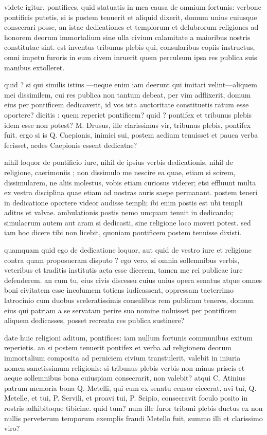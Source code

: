  videte igitur, pontifices, quid statuatis in mea causa de omnium fortunis: verbone pontificis putetis, si is postem tenuerit et aliquid dixerit, domum unius cuiusque consecrari posse, an istae dedicationes et templorum et delubrorum religiones ad honorem deorum immortalium sine ulla civium calamitate a maioribus nostris constitutae sint. est inventus tribunus plebis qui, consularibus copiis instructus, omni impetu furoris in eum civem inruerit quem perculsum ipsa res publica suis manibus extolleret.

 quid ? si qui similis istius —neque enim iam deerunt qui imitari velint—aliquem mei dissimilem, cui res publica non tantum debeat, per vim adflixerit, domum eius per pontificem dedicaverit, id vos ista auctoritate constituetis ratum esse oportere? dicitis : quem reperiet pontificem? quid ? pontifex et tribunus plebis idem esse non potest? M. Drusus, ille clarissimus vir, tribunus plebis, pontifex fuit. ergo si is Q. Caepionis, inimici sui, postem aedium tenuisset et pauca verba fecisset, aedes Caepionis essent dedicatae?

 nihil loquor de pontificio iure, nihil de ipsius verbis dedicationis, nihil de religione, caerimoniis ; non dissimulo me nescire ea quae, etiam si scirem, dissimularem, ne aliis molestus, vobis etiam curiosus viderer; etsi effluunt multa ex vestra disciplina quae etiam ad nostras auris saepe permanant. postem teneri in dedicatione oportere videor audisse templi; ibi enim postis est ubi templi aditus et valvae. ambulationis postis nemo umquam tenuit in dedicando; simulacrum autem aut aram si dedicasti, sine religione loco moveri potest. sed iam hoc dicere tibi non licebit, quoniam pontificem postem tenuisse dixisti.

 quamquam quid ego de dedicatione loquor, aut quid de vestro iure et religione contra quam proposueram disputo ? ego vero, si omnia sollemnibus verbis, veteribus et traditis institutis acta esse dicerem, tamen me rei publicae iure defenderem. an cum tu, eius civis discessu cuius unius opera senatus atque omnes boni civitatem esse incolumem totiens iudicassent, oppressam taeterrimo latrocinio cum duobus sceleratissimis consulibus rem publicam teneres, domum eius qui patriam a se servatam perire suo nomine noluisset per pontificem aliquem dedicasses, posset recreata res publica sustinere?

 date huic religioni aditum, pontifices: iam nullum fortunis communibus exitum reperietis. an si postem tenuerit pontifex et verba ad religionem deorum immortalium composita ad perniciem civium transtulerit, valebit in iniuria nomen sanctissimum religionis: si tribunus plebis verbis non minus priscis et aeque sollemnibus bona cuiuspiam consecrarit, non valebit? atqui C. Atinius patrum memoria bona Q. Metelli, qui eum ex senatu censor eiecerat, avi tui, Q. Metelle, et tui, P. Servili, et proavi tui, P. Scipio, consecravit foculo posito in rostris adhibitoque tibicine. quid tum? num ille furor tribuni plebis ductus ex non nullis perveterum temporum exemplis fraudi Metello fuit, summo illi et clarissimo viro?

